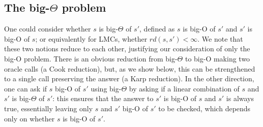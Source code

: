\documentclass[10pt,a4paper]{amsart}
\numberwithin{equation}{section}
\theoremstyle{plain}
\theoremstyle{definition}
\theoremstyle{remark}
\newcommand\tvrs{\mathit{rd}}
\begin{document}
\subsection{The big-\texorpdfstring{$\Theta$}{Theta} problem}
One could consider whether $s$ is big-$\Theta$ of $s'$, defined as $s$ is big-O of $s'$ and $s'$ is big-O of $s$; or equivalently for LMCs, whether $\tvrs(s,s') <  \infty$. We note that these two notions reduce to each other, justifying our consideration of only the big-O problem. There is an obvious reduction from big-$\Theta$  to big-O making two oracle calls (a Cook reduction), but, as we show below, this can be strengthened to a single call preserving the answer (a Karp reduction). In the other direction, one can ask if $s$ big-O of $s'$ using big-$\Theta$ by asking if a linear combination of $s$ and $s'$ is big-$\Theta$ of $s'$: this ensures that the answer to $s'$ is big-O of $s$ and $s'$ is always true, essentially leaving only $s$ and $s'$ big-O of $s'$ to be checked, which depends only on whether $s$ is big-O of $s'$.
\end{document}
